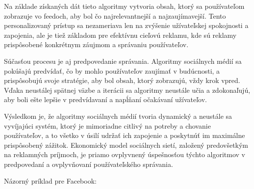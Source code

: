 \documentclass[12pt,twoside,slovak,a4paper]{article}
\begin{document}
Na základe získaných dát tieto algoritmy vytvoria obsah, ktorý sa používateľom zobrazuje vo feedoch, aby bol čo najrelevantnejší a najzaujímavejší. Tento personalizovaný prístup sa nezameriava len na zvýšenie užívateľskej spokojnosti a zapojenia, ale je tiež základom pre efektívnu cieľovú reklamu, kde sú reklamy prispôsobené konkrétnym záujmom a správaniu používateľov.

Súčasťou procesu je aj predpovedanie správania. Algoritmy sociálnych médií sa pokúšajú predvídať, čo by mohlo používateľov zaujímať v budúcnosti, a prispôsobujú svoje stratégie, aby bol obsah, ktorý zobrazujú, vždy krok vpred. Vďaka neustálej spätnej väzbe a iterácii sa algoritmy neustále učia a zdokonaľujú, aby boli ešte lepšie v predvídavaní a napĺňaní očakávaní užívateľov.

Výsledkom je, že algoritmy sociálnych médií tvoria dynamický a neustále sa vyvíjajúci systém, ktorý je mimoriadne citlivý na potreby a chovanie používateľov, a to všetko v úsilí udržať ich zapojenie a poskytnúť im maximálne prispôsobený zážitok. Ekonomický model sociálnych sietí, založený predovšetkým na reklamných príjmoch, je priamo ovplyvnený úspešnosťou týchto algoritmov v predpovedaní a ovplyvňovaní používateľského správania.



%
%
%







Názorný príklad pre Facebook:
\end{document}
